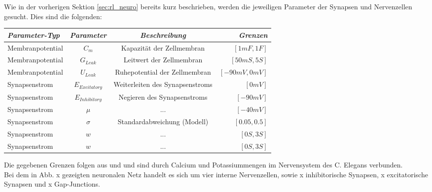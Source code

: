	Wie in der vorherigen Sektion \ref{sec:rl_neuro} bereits kurz beschrieben, werden die jeweiligen Parameter der Synapsen und Nervenzellen gesucht. Dies sind die folgenden:
	\begin{center}
		\begin{tabular}{l@{\hskip 0.5cm}c@{\hskip 0.5cm}c@{\hskip 0.5cm}r}    \toprule
			\setlength{\tabcolsep}{50pt}
			\renewcommand{\arraystretch}{1.5}
			\emph{Parameter-Typ} 	& \emph{Parameter}  & \emph{Beschreibung} 				& \emph{Grenzen} 					 \\\midrule
			Membranpotential		& $C_m$				& Kapazität der Zellmembran			& $[1mF, 1F]$						 \\ 
			Membranpotential	 	& $G_{Leak}$		& Leitwert der Zellmembran			& $[50mS, 5S]$						 \\
			Membranpotential	 	& $U_{Leak}$		& Ruhepotential der Zellmembran		& $[-90mV, 0mV]$						 \\
			Synapsenstrom			& $E_{Excitatory}$	& Weiterleiten des Synapsenstroms	& $[0mV]$							 \\
			Synapsenstrom			& $E_{Inhibitory}$	& Negieren des Synapsenstroms		& $[-90mV]$							 \\ 
			Synapsenstrom			& $\mu$				& ...								& $[-40mV]$							 \\
			Synapsenstrom			& $\sigma$			& Standardabweichung (Modell)		& $[0.05, 0.5]$						 \\ 
			Synapsenstrom		 	& $w$				& ...								& $[0S, 3S]$							 \\
			Synapsenstrom				& $\hat{w}$			& ...								& $[0S, 3S]$							 \\\bottomrule
			\hline
		\end{tabular}
	\end{center}
	Die gegebenen Grenzen folgen aus \cite{WormLevelRL} und \cite{SimCE} und sind durch Calcium und Potassiummengen im Nervensystem des C. Elegans verbunden.\\
	
	
	
	Bei dem in Abb. x gezeigten neuronalen Netz handelt es sich um vier interne Nervenzellen, sowie x inhibitorische Synapsen, x excitatorische Synapsen und x Gap-Junctions.

